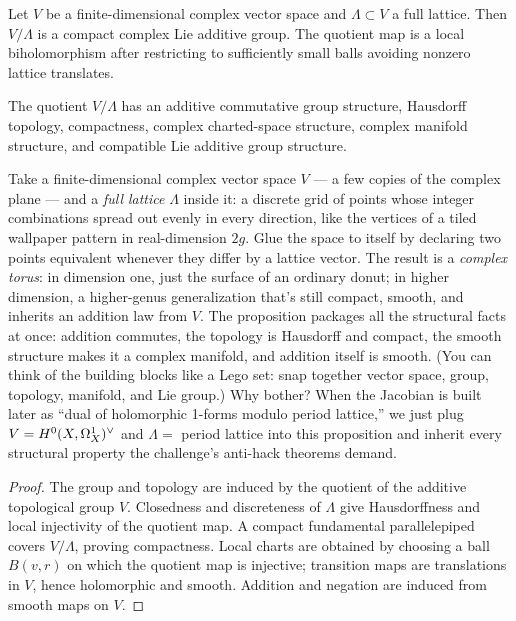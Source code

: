 Let \(V\) be a finite-dimensional complex vector space and \(\Lambda\subset V\)
a full lattice. Then \(V/\Lambda\) is a compact complex Lie additive group.
The quotient map is a local biholomorphism after restricting to sufficiently
small balls avoiding nonzero lattice translates.

\begin{proposition}
\label{prop:complex-torus-package}

The quotient \(V/\Lambda\) has an additive commutative group structure,
Hausdorff topology, compactness, complex charted-space structure, complex
manifold structure, and compatible Lie additive group structure.
\leanok
\end{proposition}

\begin{layman}
Take a finite-dimensional complex vector space \(V\) --- a few copies of
the complex plane --- and a \emph{full lattice} \(\Lambda\) inside it: a
discrete grid of points whose integer combinations spread out evenly in
every direction, like the vertices of a tiled wallpaper pattern in
real-dimension \(2g\). Glue the space to itself by declaring two points
equivalent whenever they differ by a lattice vector. The result is a
\emph{complex torus}: in dimension one, just the surface of an ordinary
donut; in higher dimension, a higher-genus generalization that's still
compact, smooth, and inherits an addition law from \(V\). The
proposition packages all the structural facts at once: addition
commutes, the topology is Hausdorff and compact, the smooth structure
makes it a complex manifold, and addition itself is smooth. (You can
think of the building blocks like a Lego set: snap together vector
space, group, topology, manifold, and Lie group.) Why bother? When the
Jacobian is built later as ``dual of holomorphic 1-forms modulo period
lattice,'' we just plug \(V = H^{0}(X,\Omega^{1}_{X})^{\vee}\) and \(\Lambda = \) period
lattice into this proposition and inherit every structural property
the challenge's anti-hack theorems demand.
\end{layman}

\begin{proof}
\leanok
The group and topology are induced by the quotient of the additive topological
group \(V\). Closedness and discreteness of \(\Lambda\) give Hausdorffness and
local injectivity of the quotient map. A compact fundamental parallelepiped
covers \(V/\Lambda\), proving compactness. Local charts are obtained by
choosing a ball \(B(v,r)\) on which the quotient map is injective; transition
maps are translations in \(V\), hence holomorphic and smooth. Addition and
negation are induced from smooth maps on \(V\).
\end{proof}

